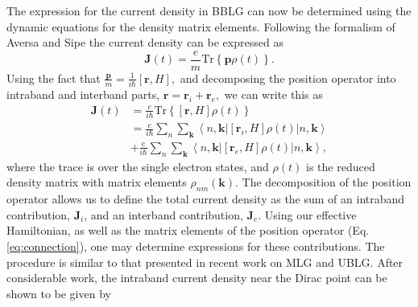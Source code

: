 \documentclass[twocolumn,secnumarabic,amssymb, nobibnotes, aps, prd, superscriptaddress]{revtex4-1}
\begin{document}
The expression for the current density in BBLG can now be determined using the dynamic equations for the density matrix elements. Following the formalism of Aversa and Sipe\cite{aversa1995nonlinear} the current density can be expressed as 
\begin{equation}\mathbf{J}(t)=\frac{e}{m}\text{Tr}\left\{ \mathbf{p}\rho(t)\right\}.\label{eq:Jt}\end{equation} Using the fact that $\frac{\mathbf{p}}{m}=\frac{1}{i\hbar}\left[\mathbf{r},H\right],$ and decomposing the position operator into intraband and interband parts, $\mathbf{r}=\mathbf{r}_{i}+\mathbf{r}_{e},$ we can write this as\cite{aversa1995nonlinear}
\begin{equation}\begin{aligned}\mathbf{J}(t) & =\frac{e}{i\hbar}\text{Tr}\left\{ \left[\mathbf{r},H\right]\rho(t)\right\} \\
 & =\frac{e}{i\hbar}\sum_{n}\sum_{\mathbf{k}}\left\langle n,\mathbf{k}\right.|\left[\mathbf{r}_{i},H\right]\rho(t)\left|n,\mathbf{k}\right\rangle \\
 & +\frac{e}{i\hbar}\sum_{n}\sum_{\mathbf{k}}\left\langle n,\mathbf{k}\right.|\left[\mathbf{r}_{e},H\right]\rho(t)\left|n,\mathbf{k}\right\rangle, 
\end{aligned}\end{equation} where the trace is over the single electron states, and $\rho(t)$ is the reduced density matrix with matrix elements $\rho_{nm}(\mathbf{k})$. The decomposition of the position operator allows us to define the total current density as the sum of an intraband contribution, $\mathbf{J}_{i}$, and an interband contribution, $\mathbf{J}_{e}$. Using our effective Hamiltonian, as well as the matrix elements of the position operator (Eq. \ref{eq:connection}), one may determine expressions for these contributions. The procedure is similar to that presented in recent work on MLG and UBLG\cite{al2015nonperturbative, mcgouran2016nonlinear}. After considerable work, the intraband current density near the Dirac point can be shown to be given by 
\end{document}
